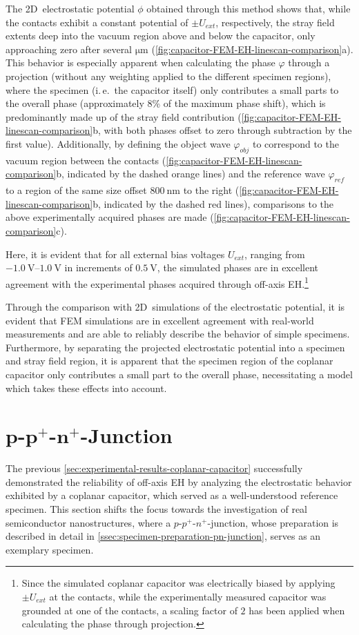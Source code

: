 The 2D~electrostatic potential $\phi$ obtained through this method shows that, while the contacts exhibit a constant potential of $\pm U_{\mathit{ext}}$, respectively, the stray field extents deep into the vacuum region above and below the capacitor, only approaching zero after several $\si{\um}$ (\cref{fig:capacitor-FEM-EH-linescan-comparison}a). This behavior is especially apparent when calculating the phase $\varphi$ through a projection (without any weighting applied to the different specimen regions), where the specimen (i.\,e.\ the capacitor itself) only contributes a small parts to the overall phase (approximately 8\% of the maximum phase shift), which is predominantly made up of the stray field contribution (\cref{fig:capacitor-FEM-EH-linescan-comparison}b, with both phases offset to zero through subtraction by the first value). Additionally, by defining the object wave $\varphi_{\mathit{obj}}$ to correspond to the vacuum region between the contacts (\cref{fig:capacitor-FEM-EH-linescan-comparison}b, indicated by the dashed orange lines) and the reference wave $\varphi_{\mathit{ref}}$ to a region of the same size offset $\SI{800}{\nm}$ to the right (\cref{fig:capacitor-FEM-EH-linescan-comparison}b, indicated by the dashed red lines), comparisons to the above experimentally acquired phases are made (\cref{fig:capacitor-FEM-EH-linescan-comparison}c).

Here, it is evident that for all external bias voltages $U_{\mathit{ext}}$, ranging from $\SIrange{-1.0}{1.0}{\volt}$ in increments of $\SI{0.5}{\volt}$, the simulated phases are in excellent agreement with the experimental phases acquired through off-axis EH.\footnote{Since the simulated coplanar capacitor was electrically biased by applying $\pm U_{\mathit{ext}}$ at the contacts, while the experimentally measured capacitor was grounded at one of the contacts, a scaling factor of $2$ has been applied when calculating the phase through projection.}

Through the comparison with 2D~simulations of the electrostatic potential, it is evident that FEM simulations are in excellent agreement with real-world measurements and are able to reliably describe the behavior of simple specimens. Furthermore, by separating the projected electrostatic potential into a specimen and stray field region, it is apparent that the specimen region of the coplanar capacitor only contributes a small part to the overall phase, necessitating a model which takes these effects into account.
\section[\texorpdfstring{$p$-$p^+$-$n^+$}{\textit{p}-\textit{p}\textsuperscript{+}-\textit{n}\textsuperscript{+}}-Junction]{$\boldsymbol{p}$-$\boldsymbol{p^+}$-$\boldsymbol{n^+}$-Junction}
The previous \cref{sec:experimental-results-coplanar-capacitor} successfully demonstrated the reliability of off-axis EH by analyzing the electrostatic behavior exhibited by a coplanar capacitor, which served as a well-understood reference specimen. This section shifts the focus towards the investigation of real semiconductor nanostructures, where a $p$-$p^+$-$n^+$-junction, whose preparation is described in detail in \cref{ssec:specimen-preparation-pn-junction}, serves as an exemplary specimen.

